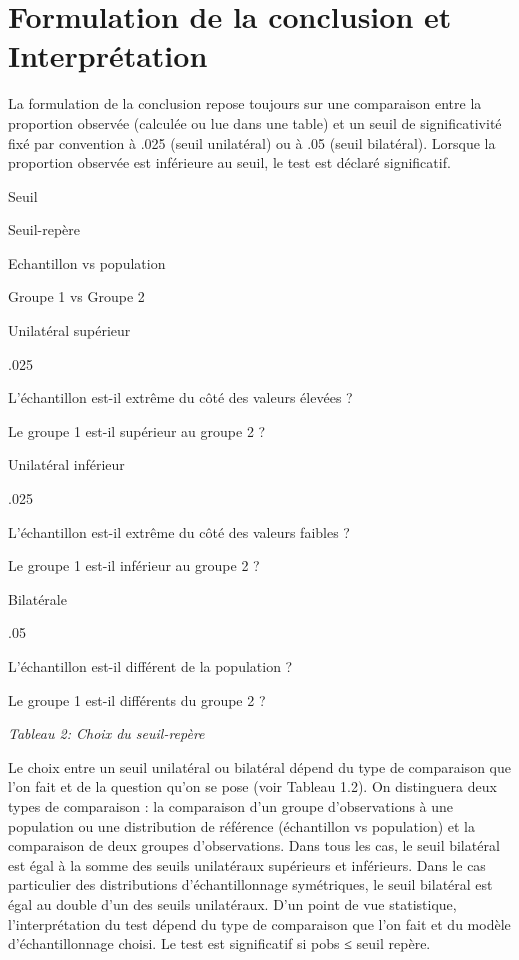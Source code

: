 \documentclass[]{book}
\theoremstyle{definition}
\theoremstyle{definition}
\theoremstyle{definition}
\theoremstyle{remark}
\begin{document}
\hypertarget{formulation-de-la-conclusion-et-interpretation}{%
\section{Formulation de la conclusion et
Interprétation}\label{formulation-de-la-conclusion-et-interpretation}}

La formulation de la conclusion repose toujours sur une comparaison
entre la proportion observée (calculée ou lue dans une table) et un
seuil de significativité fixé par convention à .025 (seuil unilatéral)
ou à .05 (seuil bilatéral). Lorsque la proportion observée est
inférieure au seuil, le test est déclaré significatif.

Seuil

Seuil-repère

Echantillon vs population

Groupe 1 vs Groupe 2

Unilatéral supérieur

.025

L'échantillon est-il extrême du côté des valeurs élevées ?

Le groupe 1 est-il supérieur au groupe 2 ?

Unilatéral inférieur

.025

L'échantillon est-il extrême du côté des valeurs faibles ?

Le groupe 1 est-il inférieur au groupe 2 ?

Bilatérale

.05

L'échantillon est-il différent de la population ?

Le groupe 1 est-il différents du groupe 2 ?

\emph{Tableau 2: Choix du seuil-repère}

Le choix entre un seuil unilatéral ou bilatéral dépend du type de
comparaison que l'on fait et de la question qu'on se pose (voir Tableau
1.2). On distinguera deux types de comparaison : la comparaison d'un
groupe d'observations à une population ou une distribution de référence
(échantillon vs population) et la comparaison de deux groupes
d'observations. Dans tous les cas, le seuil bilatéral est égal à la
somme des seuils unilatéraux supérieurs et inférieurs. Dans le cas
particulier des distributions d'échantillonnage symétriques, le seuil
bilatéral est égal au double d'un des seuils unilatéraux. D'un point de
vue statistique, l'interprétation du test dépend du type de comparaison
que l'on fait et du modèle d'échantillonnage choisi. Le test est
significatif si pobs ≤ seuil repère.
\end{document}
